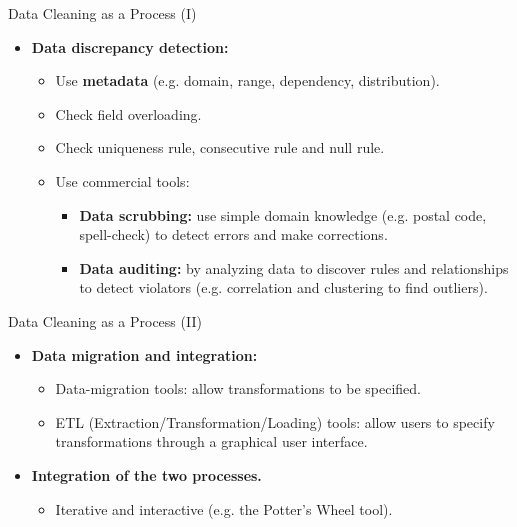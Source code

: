 \begin{frame}{Data Cleaning as a Process (I)}
	\begin{itemize}
		\item \textbf{Data discrepancy detection:}
		      \begin{itemize}
			      \item Use \textbf{\color{airforceblue}metadata} (e.g. domain,
			            range, dependency, distribution).
			      \item Check field overloading.
			      \item Check uniqueness rule, consecutive rule and null rule.
			      \item Use commercial tools:
			            \begin{itemize}
				            \item \textbf{\color{airforceblue}Data scrubbing:} use simple
				                  domain knowledge (e.g. postal code, spell-check) to detect
				                  errors and make corrections.
				            \item \textbf{\color{airforceblue}Data auditing:} by analyzing
				                  data to discover rules and relationships to detect violators
				                  (e.g. correlation and clustering to find outliers).
			            \end{itemize}
		      \end{itemize}
	\end{itemize}
\end{frame}

\begin{frame}{Data Cleaning as a Process (II)}
	\begin{itemize}
		\item \textbf{Data migration and integration:}
		      \begin{itemize}
			      \item Data-migration tools: allow transformations to be
			            specified.
			      \item ETL (Extraction/Transformation/Loading) tools: allow
			            users to specify transformations through a graphical user
			            interface.
		      \end{itemize}
		\item \textbf{Integration of the two processes.}
		      \begin{itemize}
			      \item Iterative and interactive (e.g. the Potter's Wheel tool).
		      \end{itemize}
	\end{itemize}
\end{frame}
